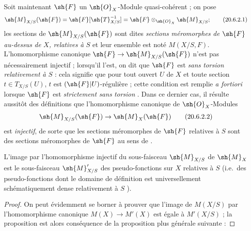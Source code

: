 \begin{env}[20.6.2]
Soit maintenant $\sh{F}$ un $\sh{O}_X$-Module quasi-cohérent ; on pose
\[
\label{IV.20.6.2.1}
  \sh{M}_{X/S}(\sh{F})=\sh{F}[\sh{T}_{X/S}^{-1}]=\sh{F}\otimes_{\sh{O}_X}\sh{M}_{X/S};
  \tag{20.6.2.1}
\]
les sections de $\sh{M}_{X/S}(\sh{F})$ sont dites \emph{sections méromorphes de $\sh{F}$ au-dessus de $X$, relatives à $S$} et leur ensemble est noté $M(X/S,F)$.
L'homomorphisme canonique $\sh{F}\to\sh{M}_{X/S}(\sh{F})$ n'est pas nécessairement injectif ; lorsqu'il l'est, on dit que $\sh{F}$ est \emph{sans torsion relativement à $S$} : cela signifie que pour tout ouvert $U$ de $X$ et toute section $t\in T_{X/S}(U)$, $t$ est $(\sh{F}|U)$-régulière ; cette condition est remplie \emph{a fortiori} lorsque $\sh{F}$ est \emph{strictement sans torsion} .
Dans ce dernier cas, il résulte aussitôt des définitions  que l'homomorphisme canonique de $\sh{O}_X$-Modules
\[
\label{IV.20.6.2.2}
  \sh{M}_{X/S}(\sh{F})\to\sh{M}_X(\sh{F})
  \tag{20.6.2.2}
\]
est \emph{injectif}, de sorte que les sections méromorphes de $\sh{F}$ relatives à $S$ sont des sections méromorphes de $\sh{F}$ au sens de .
\end{env}

\begin{proposition}[20.6.3]
\label{IV.20.6.3}
L'image par l'homomorphisme injectif  du sous-faisceau $\sh{M}_{X/S}$ de $\sh{M}_X$ est le sous-faisceau $\sh{M}'_{X/S}$ des pseudo-fonctions sur $X$ relatives à $S$ (i.e.\ des pseudo-fonctions dont le domaine de définition est universellement schématiquement dense relativement à $S$ ).
\end{proposition}

\begin{proof}
On peut évidemment se borner à prouver que l'image de $M(X/S)$ par l'homomorphisme canonique $M(X)\to M'(X)$ est égale à $M'(X/S)$ ; la proposition est alors conséquence de la proposition plus générale suivante :
\end{proof}

